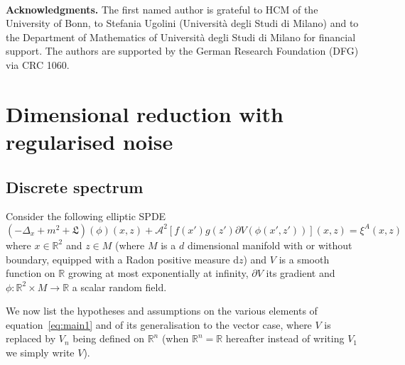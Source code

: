 \documentclass[a4paper,10pt]{article}
\newcommand{\mathd}{\mathrm{d}}
\newcommand{\tmtextbf}[1]{{\bfseries{#1}}}
\begin{document}
\

\tmtextbf{Acknowledgments.} The first named author is grateful to HCM of the
University of Bonn, to Stefania Ugolini (Universit{\`a} degli Studi di Milano)
and to the Department of Mathematics of Universit{\`a} degli Studi di Milano
for financial support. The authors are supported by the German Research
Foundation (DFG) via CRC 1060.

\section{Dimensional reduction with regularised noise}\label{section_discrete}

\subsection{Discrete spectrum}\label{section_discrete1}

Consider the following elliptic SPDE
\begin{equation}
  (- \Delta_x + m^2 + \mathfrak{L}) (\phi) (x, z) + \mathcal{A}^2 [f (x') g
  (z') \partial V (\phi (x', z'))] (x, z) = \xi^A (x, z)  \label{eq:main1}
\end{equation}
where $x \in \mathbb{R}^2$ and $z \in M$ (where $M$ is a $d$ dimensional
manifold with or without boundary, equipped with a Radon positive measure
$\mathd z$) and $V$ is a smooth function on $\mathbb{R}$ growing at most
exponentially at infinity, $\partial V$ its gradient and $\phi : \mathbb{R}^2
\times M \rightarrow \mathbb{R}$ a scalar random field.

We now list the hypotheses and assumptions on the various elements of
equation~{\eqref{eq:main1}} and of its generalisation to the vector case,
where $V$ is replaced by $V_n$ being defined on $\mathbb{R}^n$ (when
$\mathbb{R}^n =\mathbb{R}$ hereafter instead of writing $V_1$ we simply write
$V$).
\end{document}
